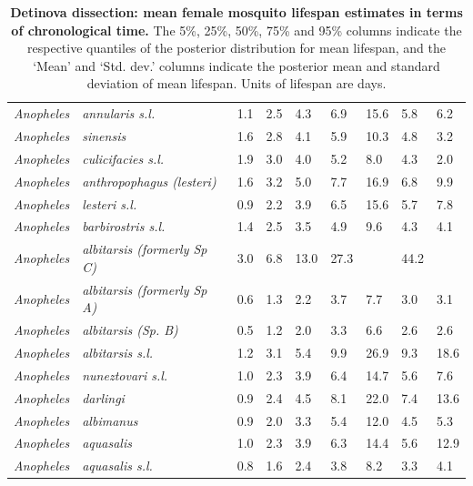 \documentclass[12pt]{article}
\begin{document}
\begin{table}[htbp!]
\begin{tabular}{l|l|l|l|l|l|l|l|l}
		\textit{Anopheles} & \textit{annularis s.l.} & 1.1 & 2.5 & 4.3 & 6.9 & 15.6 & 5.8 & 6.2 \\
		\textit{Anopheles} & \textit{sinensis} & 1.6 & 2.8 & 4.1 & 5.9 & 10.3 & 4.8 & 3.2 \\
		\textit{Anopheles} & \textit{culicifacies s.l.} & 1.9 & 3.0 & 4.0 & 5.2 & 8.0 & 4.3 & 2.0 \\
		\textit{Anopheles} & \textit{anthropophagus (lesteri)} & 1.6 & 3.2 & 5.0 & 7.7 & 16.9 & 6.8
		& 9.9 \\
		\textit{Anopheles} & \textit{lesteri s.l.} & 0.9 & 2.2 & 3.9 & 6.5 & 15.6 & 5.7 & 7.8 \\
		\textit{Anopheles} & \textit{barbirostris s.l.} & 1.4 & 2.5 & 3.5 & 4.9 & 9.6 & 4.3 & 4.1 \\
		\textit{Anopheles} & \textit{albitarsis (formerly Sp C)} & 3.0 & 6.8 & 13.0 & 27.3
		& \text{$>$100} & 44.2 & \text{$>$100} \\
		\textit{Anopheles} & \textit{albitarsis (formerly Sp A)} & 0.6 & 1.3 & 2.2 & 3.7 & 7.7 & 3.0
		& 3.1 \\
		\textit{Anopheles} & \textit{albitarsis (Sp. B)} & 0.5 & 1.2 & 2.0 & 3.3 & 6.6 & 2.6 & 2.6
		\\
		\textit{Anopheles} & \textit{albitarsis s.l.} & 1.2 & 3.1 & 5.4 & 9.9 & 26.9 & 9.3 & 18.6 \\
		\textit{Anopheles} & \textit{nuneztovari s.l.} & 1.0 & 2.3 & 3.9 & 6.4 & 14.7 & 5.6 & 7.6 \\
		\textit{Anopheles} & \textit{darlingi} & 0.9 & 2.4 & 4.5 & 8.1 & 22.0 & 7.4 & 13.6 \\
		\textit{Anopheles} & \textit{albimanus} & 0.9 & 2.0 & 3.3 & 5.4 & 12.0 & 4.5 & 5.3 \\
		\textit{Anopheles} & \textit{aquasalis} & 1.0 & 2.3 & 3.9 & 6.3 & 14.4 & 5.6 & 12.9 \\
		\textit{Anopheles} & \textit{aquasalis s.l.} & 0.8 & 1.6 & 2.4 & 3.8 & 8.2 & 3.3 & 4.1 \\
	\end{tabular}
	\caption{\textbf{Detinova dissection: mean female mosquito lifespan estimates in terms of chronological time.} The 5\%, 25\%, 50\%, 75\% and 95\% columns indicate the respective quantiles of the posterior distribution for mean lifespan, and the `Mean' and `Std. dev.' columns indicate the posterior mean and standard deviation of mean lifespan.  Units of lifespan are days.}
	\label{tab:detinova_lifespan_chronological}%
\end{table}
\end{document}
